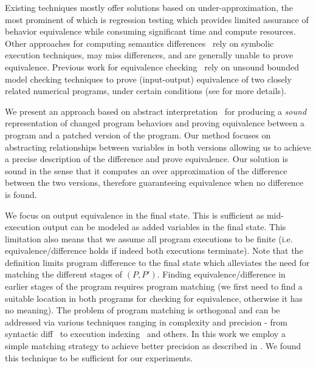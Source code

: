 Existing techniques mostly offer solutions based on  under-approximation, the most prominent of which is regression testing which provides limited assurance of behavior equivalence while consuming significant time and compute resources. 
Other approaches for computing semantics differences~\cite{DwyerElbaumPerson08,EnglerRamos11} rely on symbolic execution techniques, may miss differences, and are generally unable to prove equivalence. Previous work for equivalence checking~\cite{GodlinStrichman09} rely on unsound bounded model checking techniques to prove (input-output) equivalence of two closely related numerical programs, under certain conditions (see  for more details).

We present an approach based on abstract interpretation~\cite{CousotCousot77} for producing a \emph{sound} representation of changed program behaviors and proving equivalence between a program and a patched version of the program. Our method focuses on abstracting relationships between variables in both versions allowing us to achieve a precise description of the difference and prove equivalence. Our solution is sound in the sense that it computes an over approximation of the difference between the two versions, therefore guaranteeing equivalence when no difference is found.

We focus on output equivalence in the final state. This is sufficient as mid-execution output can be modeled as added variables in the final state. This limitation also means that we assume all program executions to be finite (i.e. equivalence/difference holds if indeed both executions terminate). Note that the definition limits program difference to the final state which alleviates the need for matching the different stages of $(P,P')$. Finding equivalence/difference in earlier stages of the program requires program matching (we first need to find a suitable location in both programs for checking for equivalence, otherwise it has no meaning). The problem of program matching is orthogonal and can be addressed via various techniques ranging in complexity and precision - from syntactic diff~\cite{} to execution indexing~\cite{} and others. In this work we employ a simple matching strategy to achieve better precision as described in . We found this technique to be sufficient for our experiments.

